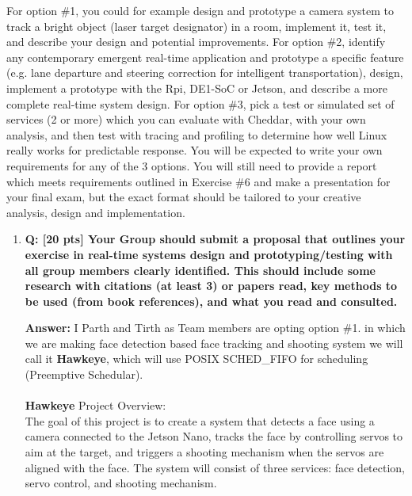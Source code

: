 \documentclass[a4paper,11pt]{article}%
\newenvironment{qanda}{\setlength{\parindent}{0pt}}{\bigskip}
\newcommand{\Q}{\bigskip\bfseries Q: }
\newcommand{\A}{\par\textbf{Answer: } \normalfont}
\begin{document}
\begin{qanda}
\begin{enumerate}
			For option \#1, you could for example design and prototype a camera system to track a bright
			object (laser target designator) in a room, implement it, test it, and describe your design and
			potential improvements. For option \#2, identify any contemporary emergent real-time
			application and prototype a specific feature (e.g. lane departure and steering correction for
			intelligent transportation), design, implement a prototype with the Rpi, DE1-SoC or Jetson,
			and describe a more complete real-time system design. For option \#3, pick a test or
			simulated set of services (2 or more) which you can evaluate with Cheddar, with your own
			analysis, and then test with tracing and profiling to determine how well Linux really works
			for predictable response. You will be expected to write your own requirements for any of the
			3 options. You will still need to provide a report which meets requirements outlined in
			Exercise \#6 and make a presentation for your final exam, but the exact format should be
			tailored to your creative analysis, design and implementation.
			\begin{enumerate}
				\item \Q [20 pts] Your Group should submit a proposal that outlines your exercise in real-time
				      systems design and prototyping/testing with all group members clearly identified. This
				      should include some research with citations (at least 3) or papers read, key methods to be
				      used (from book references), and what you read and consulted.
				      \A I Parth and Tirth as Team members are opting option \#1. in which we are making face detection based face tracking and shooting system we will  call it \textbf{Hawkeye}, which will use POSIX SCHED\_FIFO for scheduling (Preemptive Schedular).\\\\
				      \textbf{Hawkeye} Project Overview:\\
				      The goal of this project is to create a system that detects a face using a camera connected to the Jetson Nano, tracks the face by controlling servos to aim at the target, and triggers a shooting mechanism when the servos are aligned with the face. The system will consist of three services: face detection, servo control, and shooting mechanism.


\end{enumerate}
\end{enumerate}
\end{qanda}
\end{document}
